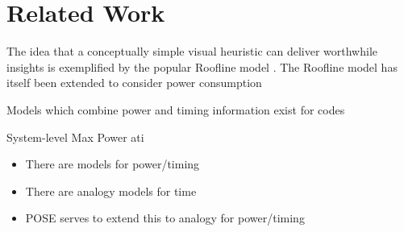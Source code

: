\section{Related Work}
\label{sec:related}


The idea that a conceptually simple visual heuristic can deliver worthwhile insights is exemplified by the popular Roofline model \cite{williams:2009aa}. The Roofline model has itself been extended to consider power consumption \cite{choi:2013aa} 



Models which combine power and timing information exist for codes 

System-level Max Power ati




\begin{itemize}
  \item There are models for power/timing
  \item There are analogy models for time
  \item POSE serves to extend this to analogy for power/timing
\end{itemize}

%
%




